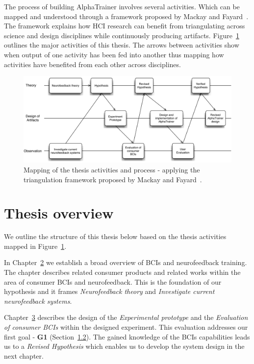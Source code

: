 \documentclass[a4paper,10pt,english,lof,lot,twoside]{puthesis}
\begin{document}
The process of building AlphaTrainer involves several activities. Which can be
mapped and understood through a framework proposed by Mackay and Fayard \cite{mackay_hci_1997}. The framework explains how HCI research can benefit
from triangulating across science and design disciplines while continuously
producing artifacts. Figure \ref{ch-intro/index:fig-triangulation} outlines the major
activities of this thesis. The arrows between activities show when output of
one activity has been fed into another thus mapping how activities have
benefited from each other across disciplines.
\begin{figure}[tbp]
\centering
\capstart

\includegraphics[width=1.000\linewidth]{triangulation.png}
\caption[Mapping of activities in the thesis activities and process]{Mapping of the thesis activities and process - applying the triangulation
framework proposed by Mackay and Fayard \cite{mackay_hci_1997}.}\label{ch-intro/index:fig-triangulation}\end{figure}


\section{Thesis overview}
\label{ch-intro/index:ch-intro-thesis-overview}\label{ch-intro/index:thesis-overview}
We outline the structure of this thesis below based on the thesis activities
mapped in Figure \ref{ch-intro/index:fig-triangulation}.

In Chapter {\hyperref[ch-background/index:ch-background]{2}} we establish a broad overview of
BCIs and neurofeedback training. The chapter describes related consumer
products and related works within the area of consumer BCIs and
neurofeedback. This is the foundation of our hypothesis and it frames
\emph{Neurofeedback theory} and \emph{Investigate current neurofeedback systems}.

Chapter {\hyperref[ch-experiment/index:ch-experiment]{3}} describes the design of the \emph{Experimental
prototype} and the \emph{Evaluation of consumer BCIs} within the designed
experiment. This evaluation addresses our first goal - \textbf{G1} (Section {\hyperref[ch-intro/index:ch-intro-hypothesis-goals]{1.2}}). The gained knowledge of the BCIs
capabilities leads us to a \emph{Revised Hypothesis}
which enables us to develop the system design in the next chapter.
\end{document}
